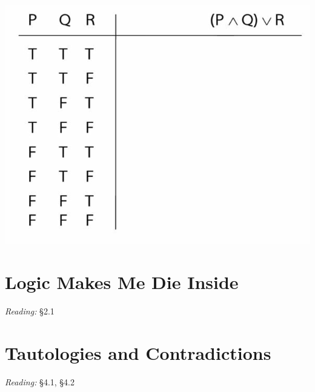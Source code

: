 \documentclass[12pt]{extarticle}
\begin{document}
\begin{multicols*}{3}
\begin{minipage}{\columnwidth}
\begin{center}
\includegraphics[scale=0.3]{img/tt_p_and_q_or_r.png}
\end{center}
\end{minipage}
 
 
 
\section{Logic Makes Me Die Inside}
 
\emph{Reading:} §2.1
 
 
 
\section{Tautologies and Contradictions}
 
\emph{Reading:} §4.1, §4.2
 

\end{multicols*}
\end{document}
